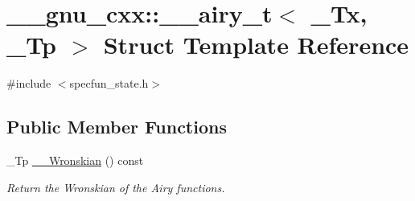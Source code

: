 \hypertarget{struct____gnu__cxx_1_1____airy__t}{}\section{\+\_\+\+\_\+gnu\+\_\+cxx\+:\+:\+\_\+\+\_\+airy\+\_\+t$<$ \+\_\+\+Tx, \+\_\+\+Tp $>$ Struct Template Reference}
\label{struct____gnu__cxx_1_1____airy__t}


{\ttfamily \#include $<$specfun\+\_\+state.\+h$>$}

\subsection*{Public Member Functions}
\begin{DoxyCompactItemize}
\item 
\+\_\+\+Tp \hyperlink{struct____gnu__cxx_1_1____airy__t_ab912cd453185e0f9181a0057ca15a54e}{\+\_\+\+\_\+\+Wronskian} () const 
\begin{DoxyCompactList}\small\item\em Return the Wronskian of the Airy functions. \end{DoxyCompactList}\end{DoxyCompactItemize}
